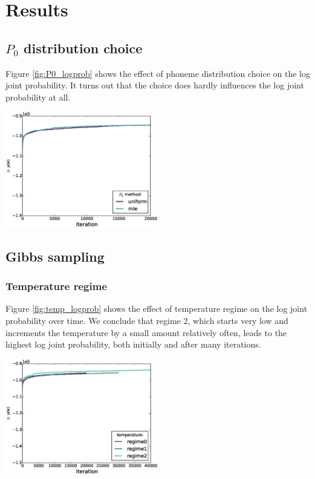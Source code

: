 \section{Results}

\subsection{$P_0$ distribution choice}

Figure \ref{fig:P0_logprob} shows the effect of phoneme distribution choice on the log joint probability. It turns out that the choice does hardly influences the log joint probability at all.

\begingroup
    \centering
    \includegraphics[width=0.5\textwidth]{images/P0_method-log_prob}
    \label{fig:P0_logprob}
\endgroup

\subsection{Gibbs sampling}

\subsubsection{Temperature regime}

Figure \ref{fig:temp_logprob} shows the effect of temperature regime on the log joint probability over time. We conclude that regime 2, which starts very low and increments the temperature by a small amount relatively often, leads to the highest log joint probability, both initially and after many iterations.

\begingroup
    \centering
    \includegraphics[width=0.5\textwidth]{images/temperature-log_prob}
	\label{fig:temp_logprob}
\endgroup

